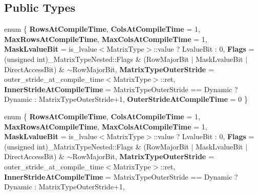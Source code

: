 \subsection*{Public Types}
\begin{DoxyCompactItemize}
\item 
\mbox{\label{struct_eigen_1_1internal_1_1traits_3_01_diagonal_3_01_matrix_type_00_01_diag_index_01_4_01_4_a227d056db48142a7f6cdbba8ef818756}} 
enum \{ \newline
{\bfseries Rows\+At\+Compile\+Time}, 
{\bfseries Cols\+At\+Compile\+Time} = 1, 
{\bfseries Max\+Rows\+At\+Compile\+Time}, 
{\bfseries Max\+Cols\+At\+Compile\+Time} = 1, 
\newline
{\bfseries Mask\+Lvalue\+Bit} = is\+\_\+lvalue$<$Matrix\+Type$>$\+:\+:value ? Lvalue\+Bit \+: 0, 
{\bfseries Flags} = (unsigned int)\+\_\+\+Matrix\+Type\+Nested\+:\+:Flags \& (Row\+Major\+Bit $\vert$ Mask\+Lvalue\+Bit $\vert$ Direct\+Access\+Bit) \& $\sim$\+Row\+Major\+Bit, 
{\bfseries Matrix\+Type\+Outer\+Stride} = outer\+\_\+stride\+\_\+at\+\_\+compile\+\_\+time$<$Matrix\+Type$>$\+:\+:ret, 
{\bfseries Inner\+Stride\+At\+Compile\+Time} = Matrix\+Type\+Outer\+Stride == Dynamic ? Dynamic \+: Matrix\+Type\+Outer\+Stride+1, 
\newline
{\bfseries Outer\+Stride\+At\+Compile\+Time} = 0
 \}
\item 
\mbox{\label{struct_eigen_1_1internal_1_1traits_3_01_diagonal_3_01_matrix_type_00_01_diag_index_01_4_01_4_ad460c7f1b83ab89b7228065503e0ef8c}} 
enum \{ \newline
{\bfseries Rows\+At\+Compile\+Time}, 
{\bfseries Cols\+At\+Compile\+Time} = 1, 
{\bfseries Max\+Rows\+At\+Compile\+Time}, 
{\bfseries Max\+Cols\+At\+Compile\+Time} = 1, 
\newline
{\bfseries Mask\+Lvalue\+Bit} = is\+\_\+lvalue$<$Matrix\+Type$>$\+:\+:value ? Lvalue\+Bit \+: 0, 
{\bfseries Flags} = (unsigned int)\+\_\+\+Matrix\+Type\+Nested\+:\+:Flags \& (Row\+Major\+Bit $\vert$ Mask\+Lvalue\+Bit $\vert$ Direct\+Access\+Bit) \& $\sim$\+Row\+Major\+Bit, 
{\bfseries Matrix\+Type\+Outer\+Stride} = outer\+\_\+stride\+\_\+at\+\_\+compile\+\_\+time$<$Matrix\+Type$>$\+:\+:ret, 
{\bfseries Inner\+Stride\+At\+Compile\+Time} = Matrix\+Type\+Outer\+Stride == Dynamic ? Dynamic \+: Matrix\+Type\+Outer\+Stride+1, 

\end{DoxyCompactItemize}
